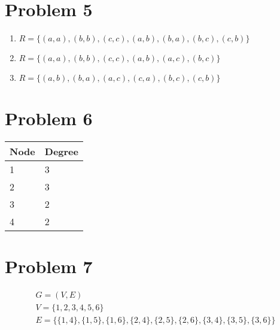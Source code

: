 \documentclass{article}
\newenvironment{problem}[1]{
  \nobreak\section*{Problem #1}
}{}
\begin{document}
  \begin{problem}{5}
    \begin{enumerate}
      \item $R = \{(a, a), (b, b), (c, c), (a, b), (b, a), (b, c), (c, b)\}$
      \item $R = \{(a, a), (b, b), (c, c), (a, b), (a, c), (b, c)\}$
      \item $R = \{(a, b), (b, a), (a, c), (c, a), (b, c), (c, b)\}$
    \end{enumerate}
  \end{problem}

  \begin{problem}{6}
    \begin{center}
    \end{center}

    \begin{table}[h]
      \centering
      \begin{tabular}{ll}
      Node & Degree \\ \hline
      1 & 3 \\
      2 & 3 \\
      3 & 2 \\
      4 & 2
      \end{tabular}
    \end{table}
  \end{problem}

  \begin{problem}{7}
    \begin{equation*}
      \begin{gathered}
        G = (V, E)\\
        V = \{1, 2, 3, 4, 5, 6\}\\
        E = \{\{1, 4\}, \{1, 5\}, \{1, 6\}, \{2, 4\}, \{2, 5\}, \{2, 6\}, \{3, 4\}, \{3, 5\}, \{3, 6\}\}
      \end{gathered}
    \end{equation*}
  \end{problem}
\end{document}
